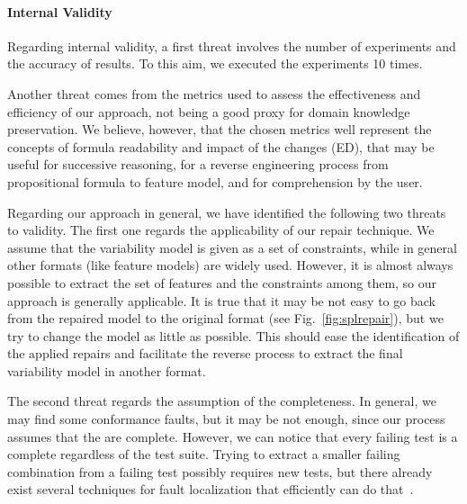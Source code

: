 \begin{tikzborder}{\cite{Gargantini16:validation}}
\begin{tikzborder}{\cite{gargantini_combinatorial_2017}}
\begin{tikzborder}{\cite{garn2019}}
\begin{tikzborder}{\cite{arcaini2019achieving}}
\begin{tikzborder}{\cite{arcaini2019varivolution}}
		\paragraph{Internal Validity}
		Regarding internal validity, a first threat involves the number of experiments and the accuracy of results. To this aim, we executed the experiments 10 times.
		
		Another threat comes from the metrics used to assess the effectiveness and efficiency of our approach, not being a good proxy for domain knowledge preservation. We believe, however, that the chosen metrics well represent the concepts of formula readability and impact of the changes (ED), that may be useful for successive reasoning, for a reverse engineering process from propositional formula to feature model, and for comprehension by the user.
		
		\smallskip
		
		Regarding our approach in general, we have identified the following two threats to validity. The first one regards the applicability of our repair technique. We assume that the variability model is given as a set of constraints, while in general other formats (like feature models) are widely used. However, it is almost always possible to extract the set of features and the constraints among them, so our approach is generally applicable. It is true that it may be not easy to go back from the repaired model to the original format (see Fig.~\ref{fig:splrepair}), but we try to change the model as little as possible. This should ease the identification of the applied repairs and facilitate the reverse process to extract the final variability model in another format.
		
		The second threat regards the assumption of the \fccs completeness. In general, we may find some conformance faults, but it may be not enough, since our process assumes that the \fccs are complete. However, we can notice that every failing test is a complete \fcc regardless of the test suite. Trying to extract a smaller failing combination from a failing test possibly requires new tests, but there already exist several techniques for fault localization that efficiently can do that~\cite{ben_2015}.	
		\be
		

\end{tikzborder}
\end{tikzborder}
\end{tikzborder}
\end{tikzborder}
\end{tikzborder}
